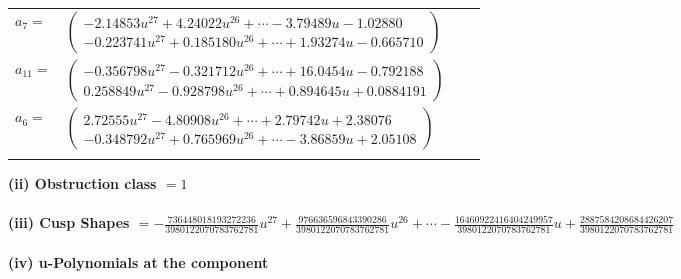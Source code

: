 \documentclass[1p]{elsarticle_modified}
\theoremstyle{definition}
\begin{document}
\begin{tabular}{m{7pt} m{180pt} m{7pt} m{180pt} }
\flushright $a_{7}=$&$\begin{pmatrix}-2.14853 u^{27}+4.24022 u^{26}+\cdots-3.79489 u-1.02880\\-0.223741 u^{27}+0.185180 u^{26}+\cdots+1.93274 u-0.665710\end{pmatrix}$ \\
\flushright $a_{11}=$&$\begin{pmatrix}-0.356798 u^{27}-0.321712 u^{26}+\cdots+16.0454 u-0.792188\\0.258849 u^{27}-0.928798 u^{26}+\cdots+0.894645 u+0.0884191\end{pmatrix}$ \\
\flushright $a_{6}=$&$\begin{pmatrix}2.72555 u^{27}-4.80908 u^{26}+\cdots+2.79742 u+2.38076\\-0.348792 u^{27}+0.765969 u^{26}+\cdots-3.86859 u+2.05108\end{pmatrix}$\\&\end{tabular}
\flushleft \textbf{(ii) Obstruction class $= 1$}\\~\\
\flushleft \textbf{(iii) Cusp Shapes $= -\frac{736448018193272236}{3980122070783762781} u^{27}+\frac{976636596843390286}{3980122070783762781} u^{26}+\cdots-\frac{16460922416404249957}{3980122070783762781} u+\frac{2887584208684426207}{3980122070783762781}$}\\~\\
\newpage\renewcommand{\arraystretch}{1}
\flushleft \textbf{(iv) u-Polynomials at the component}\newline \\
\end{document}
